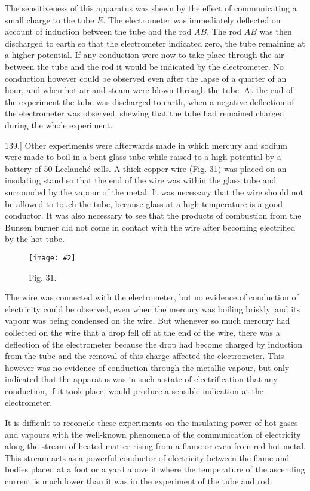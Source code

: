 \documentclass[12pt,oneside]{book}[2021/10/04]
\newcommand{\Runhead}[1]{\fancyhead[C]{\iffloatpage{}{\small#1}}}
\newcommand{\article}[1]{\phantomsection \label{art:#1}{#1.]}}
\newcommand{\widefig}[3]{
\begin{figure}[ht!]
\centering
\texttt{[image: \#2]}
\caption*{\small #3}
\end{figure}}
\newcommand{\¬}{\hphantom{0}}
\begin{document}
The sensitiveness of this apparatus was shewn by the effect of
communicating a small charge to the tube \(E\). The electrometer
was immediately deflected on account of induction between the
tube and the rod \(AB\). The rod \(AB\) was then discharged to earth
so that the electrometer indicated zero, the tube remaining at a
higher potential. If any conduction were now to take place
through the air between the tube and the rod it would be indicated
by the electrometer. No conduction however could be observed
even after the lapse of a quarter of an hour, and when hot air and
steam were blown through the tube. At the end of the experiment
the tube was discharged to earth, when a negative deflection
of the electrometer was observed, shewing that the tube had remained
charged during the whole experiment.

\article{139} Other experiments were afterwards made in which mercury
and sodium were made to boil in a bent glass tube while raised to
a high potential by a battery of 50 Leclanché cells. A thick
copper wire (Fig. 31) was placed on an insulating stand so that the
end of the wire was within the glass tube and surrounded by the
vapour of the metal. It was necessary that the wire should not
be allowed to touch the tube, because glass at a high temperature
is a good conductor. It was also necessary to see that the
products of combustion from the Bunsen burner did not come
in contact with the wire after becoming electrified by the hot
tube.
\Runhead{CONDUCTIVITY OF GASES.}

\widefig{0.69}{133.png}{Fig. 31.}
The wire was connected with the electrometer, but no evidence of
conduction of electricity could be observed, even when the mercury
was boiling briskly, and its vapour was being condensed on the
wire. But whenever so much mercury had collected on the wire
that a drop fell off at the end of the wire, there was a deflection
of the electrometer because the drop had become charged by induction
from the tube and the removal of this charge affected
the electrometer. This however was no evidence of conduction
through the metallic vapour, but only indicated that the apparatus
was in such a state of electrification that any conduction, if it took
place, would produce a sensible indication at the electrometer.

It is difficult to reconcile these experiments on the insulating
power of hot gases and vapours with the well-known phenomena
of the communication of electricity along the stream of heated
matter rising from a flame or even from red-hot metal. This
stream acts as a powerful conductor of electricity between the flame
and bodies placed at a foot or a yard above it where the temperature
of the ascending current is much lower than it was in the experiment
of the tube and rod.
\end{document}
